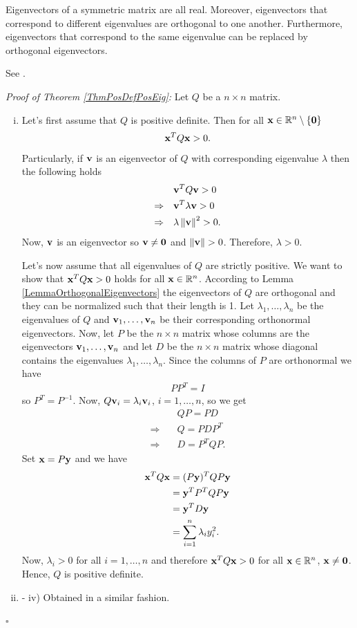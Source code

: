 \documentclass[a4paper,12pt,twoside,BCOR=10mm]{scrbook}
\begin{document}
\begin{lemma}\label{LemmaOrthogonalEigenvectors}
Eigenvectors of a symmetric matrix are all real. Moreover, eigenvectors that correspond to different eigenvalues are orthogonal to one another. Furthermore, eigenvectors that correspond to the same eigenvalue can be replaced by orthogonal eigenvectors.
\end{lemma}

See \citep{peressini1988mathematics}.

\textit{Proof of Theorem \ref{ThmPosDefPosEig}:}
Let $Q$ be a $n \times n$ matrix.
\begin{enumerate}[i)]
    \item
    Let's first assume that $Q$ is positive definite. Then for all $\mathbf{x} \in \mathbb{R}^{n}\setminus\{\mathbf{0}\}$
\begin{align*}
    \mathbf{x}^T Q \mathbf{x} > 0.
\end{align*}
Particularly, if $\mathbf{v}$ is an eigenvector of $Q$ with corresponding eigenvalue $\lambda$ then the following holds
\begin{align*}
    &\mathbf{v}^T Q \mathbf{v} > 0\\
    \Rightarrow\quad& \mathbf{v}^T \lambda \mathbf{v} > 0\\
    \Rightarrow\quad& \lambda \left\lVert\mathbf{v}\right\rVert^2 > 0.
\end{align*}
Now, $\mathbf{v}$ is an eigenvector so $\mathbf{v} \neq \mathbf{0}$ and $\left\lVert\mathbf{v}\right\rVert > 0$. Therefore, $\lambda > 0$.

Let's now assume that all eigenvalues of $Q$ are strictly positive. We want to show that $\mathbf{x}^T Q \mathbf{x} > 0$ holds for all $\mathbf{x} \in \mathbb{R}^{n}$. According to Lemma \ref{LemmaOrthogonalEigenvectors} the eigenvectors of $Q$ are orthogonal and they can be normalized such that their length is 1. Let $\lambda_1, \ldots, \lambda_n$ be the eigenvalues of $Q$ and $\mathbf{v}_1, \ldots, \mathbf{v}_n$ be their corresponding orthonormal eigenvectors. Now, let $P$ be the $n\times n$ matrix whose columns are the eigenvectors $\mathbf{v}_1, \ldots, \mathbf{v}_n$ and let $D$ be the $n\times n$ matrix whose diagonal contains the eigenvalues $\lambda_1, \ldots, \lambda_n$. Since the columns of $P$ are orthonormal we have
\begin{align*}
    PP^T = I
\end{align*}
so $P^T = P^{-1}$. Now, $Q\mathbf{v}_i = \lambda_i \mathbf{v}_i$, $i = 1, \ldots, n$, so we get
\begin{align*}
    &QP = PD\\
    \Rightarrow\quad&Q = PDP^T\\
    \Rightarrow\quad&D = P^TQP.
\end{align*}
Set $\mathbf{x} = P\mathbf{y}$ and we have
\begin{align*}
    \mathbf{x}^T Q \mathbf{x} &= (P\mathbf{y})^TQP\mathbf{y}\\
    &= \mathbf{y}^T P^T Q P \mathbf{y}\\
    &= \mathbf{y}^T D \mathbf{y}\\
    &= \sum_{i = 1}^n \lambda_i y_i^2.
\end{align*}
Now, $\lambda_i > 0$ for all $i = 1, \ldots, n$ and therefore $\mathbf{x}^T Q \mathbf{x} > 0$ for all $\mathbf{x} \in \mathbb{R}^{n}$, $\mathbf{x} \neq \mathbf{0}$. Hence, $Q$ is positive definite.
\item - iv) Obtained in a similar fashion.
\end{enumerate}
\hfill $\square$
\end{document}
